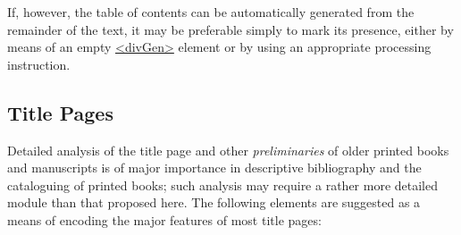 If, however, the table of contents can be automatically generated from the remainder of the text, it may be preferable simply to mark its presence, either by means of an empty \hyperref[TEI.divGen]{<divGen>} element or by using an appropriate processing instruction.
\subsection[{Title Pages}]{Title Pages}\label{DSTITL}\par
Detailed analysis of the title page and other \textit{preliminaries} of older printed books and manuscripts is of major importance in descriptive bibliography and the cataloguing of printed books; such analysis may require a rather more detailed module than that proposed here. The following elements are suggested as a means of encoding the major features of most title pages: 
